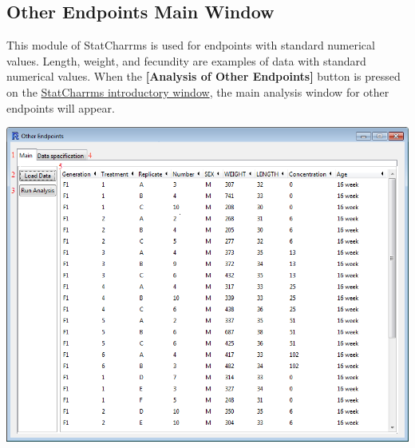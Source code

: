 \documentclass[a4paper]{article}
\begin{document}
\subsection*{Other Endpoints Main Window}


	This module of StatCharrms  is used for endpoints with standard numerical values. Length, weight, and fecundity 
	are examples of data with standard numerical values.  
	When the \textbf{[Analysis of Other Endpoints]} button is pressed on the 
	\hyperlink{fig:IntroWindow}{StatCharrms introductory window}, the main analysis window for other endpoints 
	will appear. 
	
	
	\begin{center}
	\hypertarget{fig:OEMain}{\includegraphics[width=\textwidth,keepaspectratio]{StandardAnl2.png}}
	\end{center} 
\end{document}
